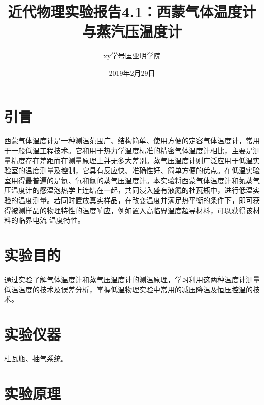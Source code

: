 \documentclass[a4paper]{article}
\title{近代物理实验报告4.1：西蒙气体温度计与蒸汽压温度计}
\author{xy\quad 学号\quad 匡亚明学院}
\date{2019年2月29日}
\begin{document}
\maketitle


\section{引言}
西蒙气体温度计是一种测温范围广、结构简单、使用方便的定容气体温度计，常用于一般低温工程技术。它和用于热力学温度标准的精密气体温度计相比，主要是测量精度存在差距而在测量原理上并无多大差别。蒸气压温度计则广泛应用于低温实验室的温度测量及控制，它具有反应快、准确性好、简单方便的优点。在低温实验室用得最普遍的是氦、氧和氮的蒸气压温度计。本实验将西蒙气体温度计和氮蒸气压温度计的感温泡热学上连结在一起，共同浸入盛有液氮的杜瓦瓶中，进行低温实验的温度测量。若同时置放真实样品，在改变温度并满足热平衡的条件下，即可获得被测样品的物理特性的温度响应，例如置入高临界温度超导材料，可以获得该材料的临界电流-温度特性。

\section{实验目的}
通过实验了解气体温度计和蒸气压温度计的测温原理，学习利用这两种温度计测量低温温度的技术及误差分析，掌握低温物理实验中常用的减压降温及恒压控温的技术。

\section{实验仪器}
杜瓦瓶、抽气系统。

\section{实验原理}
\end{document}
